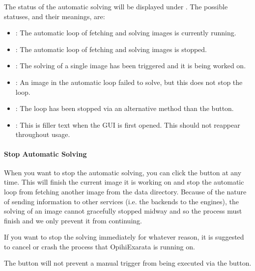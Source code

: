 \documentclass[letterpaper,11pt,english]{sphinxmanual}
\begin{document}
\sphinxAtStartPar
The status of the automatic solving will be displayed under
. The possible statuses, and their meanings, are:
\begin{itemize}
\item {} 
\sphinxAtStartPar
{}: The automatic loop of fetching and solving images is currently running.

\item {} 
\sphinxAtStartPar
{}: The automatic loop of fetching and solving images is stopped.

\item {} 
\sphinxAtStartPar
{}: The solving of a single image has been triggered and it is being worked on.

\item {} 
\sphinxAtStartPar
{}: An image in the automatic loop failed to solve, but this does not stop the loop.

\item {} 
\sphinxAtStartPar
{}: The loop has been stopped via an alternative method than the  button.

\item {} 
\sphinxAtStartPar
{}: This is filler text when the GUI is first opened. This should not reappear throughout usage.

\end{itemize}


\paragraph{Stop Automatic Solving}
\label{\detokenize{user/automatic_mode:stop-automatic-solving}}
\sphinxAtStartPar
When you want to stop the automatic solving, you can click the  button
at any time. This will finish the current image it is working on and stop the
automatic loop from fetching another image from the data directory. Because of
the nature of sending information to other services (i.e. the backends to the
engines), the solving of an image cannot gracefully stopped mid\sphinxhyphen{}way and so the
process must finish and we only prevent it from continuing.

\sphinxAtStartPar
If you want to stop the solving immediately for whatever reason, it is
suggested to cancel or crash the process that OpihiExarata is running on.

\sphinxAtStartPar
The  button will not prevent a manual trigger from being executed via
the  button.
\end{document}
